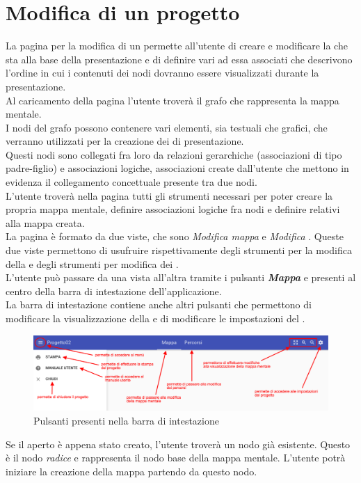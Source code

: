 \section{Modifica di un progetto} \label{editor}
La pagina per la modifica di un  permette all'utente di creare e modificare la  che sta alla base della presentazione e di definire vari  ad essa associati che descrivono l'ordine in cui i contenuti dei nodi dovranno essere visualizzati durante la presentazione.\\
Al caricamento della pagina l'utente troverà il grafo che rappresenta la mappa mentale.\\
I nodi del grafo possono contenere vari elementi, sia testuali che grafici, che verranno utilizzati per la creazione dei  di presentazione.\\
Questi nodi sono collegati fra loro da relazioni gerarchiche (associazioni di tipo padre-figlio) e associazioni logiche, associazioni create dall'utente che mettono in evidenza il collegamento concettuale presente tra due nodi. \\
L'utente troverà nella pagina tutti gli strumenti necessari per poter creare la propria mappa mentale, definire associazioni logiche fra nodi e definire  relativi alla mappa creata.\\
La pagina è formato da due viste, che sono \textit{Modifica mappa} e \textit{Modifica }.
Queste due viste permettono di usufruire rispettivamente degli strumenti per la modifica della  e degli strumenti per modifica  dei .\\
L'utente può passare da una vista all'altra tramite i pulsanti \textbf{\textit{Mappa}} e \textbf{} presenti al centro della barra di intestazione dell'applicazione.\\
La barra di intestazione contiene anche altri pulsanti che permettono di modificare la visualizzazione della  e di modificare le impostazioni del .
\begin{figure}[H]
\centering
\includegraphics[scale=0.32]{immagini/strumentiHeader.pdf}
\caption{Pulsanti presenti nella barra di intestazione}
\end{figure}
Se il  aperto è appena stato creato, l'utente troverà un nodo già esistente. Questo è il nodo \textit{radice} e rappresenta il nodo base della mappa mentale. L'utente potrà iniziare la creazione della mappa partendo da questo nodo.

